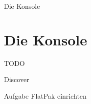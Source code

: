 
\begin{frame}{Die Konsole}
    \section{Die Konsole}\label{sec:die-konsole}

    TODO


\end{frame}


\begin{frame}{Discover}

    \vspace{0.5cm}
    \begin{alertblock}{Aufgabe}
        FlatPak einrichten
    \end{alertblock}

\end{frame}